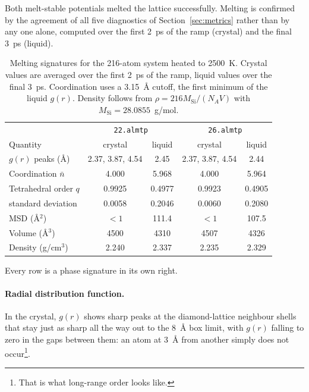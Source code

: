 \documentclass{article}
\begin{document}
Both melt-stable potentials melted the lattice successfully. Melting is confirmed by the agreement of all five diagnostics of Section~\ref{sec:metrics} rather than by any one alone, computed over the first 2~ps of the ramp (crystal) and the final 3~ps (liquid).

\begin{table}[H]
    \renewcommand{\arraystretch}{1.3}
    \centering
    \small
    \begin{tabular}{p{}|c|c|c|c}
        \toprule
        & \multicolumn{2}{c|}{\texttt{22.almtp}} & \multicolumn{2}{c}{\texttt{26.almtp}} \\
        Quantity & crystal & liquid & crystal & liquid \\
        \midrule
        $g(r)$ peaks (\AA)      & 2.37, 3.87, 4.54 & 2.45 & 2.37, 3.87, 4.54 & 2.44 \\ \hline
        Coordination $\bar{n}$   & 4.000 & 5.968 & 4.000 & 5.964 \\ \hline
        Tetrahedral order $q$    & 0.9925 & 0.4977 & 0.9923 & 0.4905 \\
        standard deviation & 0.0058 & 0.2046 & 0.0060 & 0.2080 \\ \hline
        MSD (\AA$^2$)            & $<1$ & 111.4 & $<1$ & 107.5 \\ \hline
        Volume (\AA$^3$)         & 4500 & 4310 & 4507 & 4326 \\ \hline
        Density (g/cm$^3$)       & 2.240 & 2.337 & 2.235 & 2.329 \\
        \bottomrule
    \end{tabular}
    \caption{Melting signatures for the 216-atom system heated to 2500~K. Crystal values are averaged over the first 2~ps of the ramp, liquid values over the final 3~ps. Coordination uses a 3.15~\AA{} cutoff, the first minimum of the liquid $g(r)$. Density follows from $\rho = 216 M_{\text{Si}}/(N_A V)$ with $M_{\text{Si}} = 28.0855$~g/mol.}
    \label{tab:melt_signatures}
\end{table}

Every row is a phase signature in its own right.
\paragraph{Radial distribution function.}
In the crystal, $g(r)$ shows sharp peaks at the diamond-lattice neighbour shells that stay just as sharp all the way out to the 8~\AA{} box limit, with $g(r)$ falling to zero in the gaps between them: an atom at 3~\AA{} from another simply does not occur\footnote{That is what long-range order looks like.}.
\end{document}
